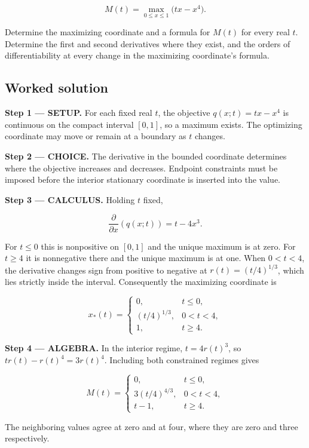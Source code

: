 \documentclass[11pt,oneside,openany]{book}
\begin{document}
\[
M(t)=\max_{0\le x\le1}\bigl(tx-x^4\bigr).
\]

Determine the maximizing coordinate and a formula for \(M(t)\) for every real \(t\). Determine the first and second derivatives where they exist, and the orders of differentiability at every change in the maximizing coordinate's formula.
\subsection*{Worked solution}

\textbf{Step 1 --- SETUP.} For each fixed real \(t\), the objective \(q(x;t)=tx-x^4\) is continuous on the compact interval \([0,1]\), so a maximum exists. The optimizing coordinate may move or remain at a boundary as \(t\) changes.

\begin{ChoiceStep}
\textbf{Step 2 --- CHOICE.} The derivative in the bounded coordinate determines where the objective increases and decreases. Endpoint constraints must be imposed before the interior stationary coordinate is inserted into the value.

\end{ChoiceStep}
\textbf{Step 3 --- CALCULUS.} Holding \(t\) fixed,

\[
\frac{\partial}{\partial x}\left(q(x;t)\right)=t-4x^3.
\]

For \(t\le0\) this is nonpositive on \([0,1]\) and the unique maximum is at zero. For \(t\ge4\) it is nonnegative there and the unique maximum is at one. When \(0<t<4\), the derivative changes sign from positive to negative at \(r(t)=(t/4)^{1/3}\), which lies strictly inside the interval. Consequently the maximizing coordinate is

\[
x_*(t)=
\begin{cases}
0,&t\le0,\\
(t/4)^{1/3},&0<t<4,\\
1,&t\ge4.
\end{cases}
\]

\begingroup\color{AlgebraBlue}
\textbf{Step 4 --- ALGEBRA.} In the interior regime, \(t=4r(t)^3\), so \(tr(t)-r(t)^4=3r(t)^4\). Including both constrained regimes gives

\[
M(t)=
\begin{cases}
0,&t\le0,\\
3(t/4)^{4/3},&0<t<4,\\
t-1,&t\ge4.
\end{cases}
\]

The neighboring values agree at zero and at four, where they are zero and three respectively.
\end{document}

